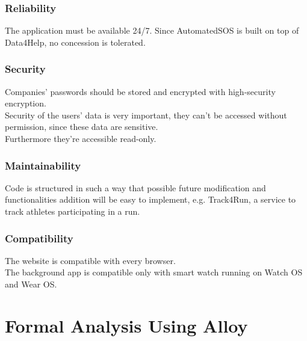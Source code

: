 \documentclass{article}
\begin{document}
\subsubsection{Reliability}
The application must be available 24/7. Since AutomatedSOS is built on top of Data4Help, no concession is tolerated.
\subsubsection{Security}
Companies' passwords should be stored and encrypted with high-security encryption. \\
Security of the users' data is very important, they can't be accessed without permission, since these data are sensitive. \\
Furthermore they're accessible read-only.
\subsubsection{Maintainability}
Code is structured in such a way that possible future modification and functionalities addition will be easy to implement, e.g. Track4Run, a service to track athletes participating in a run.
\subsubsection{Compatibility}
The website is compatible with every browser. \\
The background app is compatible only with smart watch running on Watch OS and Wear OS.
\newpage
\section{Formal Analysis Using Alloy}
\end{document}
